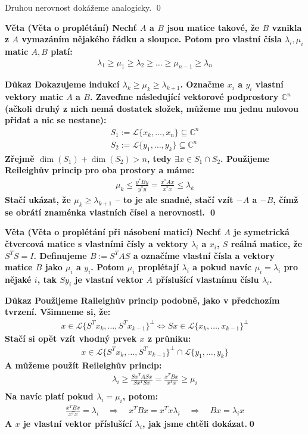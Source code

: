 \documentclass[a4paper,12pt,titlepage]{article}
\newcommand{\dk}{\smallskip\noindent\bf Důkaz\rm{} }
\newcommand{\vt}{\smallskip\noindent\bf Věta\rm{} }
\renewcommand{\L}{\mathcal{L}}
\newcommand{\C}{\mathbb{C}}
\renewcommand{\L}{\mathcal{L}}
\begin{document}
Druhou nerovnost dokážeme analogicky. \qed


\vt (Věta o proplétání) Nechť $A$ a $B$ jsou matice takové, že $B$ vznikla z $A$ 
vymazáním nějakého řádku a sloupce. Potom pro vlastní čísla $\lambda_i,\mu_i$ 
matic $A,B$ platí:
\begin{align}
	\lambda_1 \geq \mu_1 \geq \lambda_2 \geq \dots\geq \mu_{n-1} \geq \lambda_n
\end{align}

\dk Dokazujeme indukcí $\lambda_k \geq \mu_k \geq \lambda_{k+1}$. Označme $x_i$ 
a $y_i$ vlastní vektory matic $A$ a $B$.  Zaveďme následující vektorové 
podprostory $\C^n$ (ačkoli druhý z nich nemá dostatek složek, můžeme mu jednu 
nulovou přidat a nic se nestane):
\begin{align}
S_1 := \L\{x_k, \dots, x_n\} \subseteq \C^n \\
S_2 := \L\{y_1, \dots, y_k\} \subseteq \C^n
\end{align}
Zřejmě $\dim(S_1) + \dim(S_2) > n$, tedy $\exists x \in S_1\cap S_2$. Použijeme 
Reileighův princip pro oba prostory a máme:
\begin{align}
	\mu_k \leq \frac{y^*By}{y^*y} = \frac{x^*Ax}{x^*x} \leq \lambda_k
\end{align}
Stačí ukázat, že $\mu_k \geq \lambda_{k+1}$ -- to je ale snadné, stačí vzít $-A$ 
a $-B$, čímž se obrátí znaménka vlastních čísel a nerovnosti. \qed

\vt (Věta o proplétání při násobení maticí) Nechť $A$ je symetrická čtvercová matice 
s vlastními čísly a vektory $\lambda_i$ a $x_i$, $S$ reálná matice, že $S^TS=I$.  
Definujeme $B := S^TAS$ a označíme vlastní čísla a vektory matice $B$ jako 
$\mu_i$ a $y_i$. Potom $\mu_i$ proplétají $\lambda_i$ a pokud navíc $\mu_i = 
\lambda_i$ pro nějaké $i$, tak $Sy_i$ je vlastní vektor $A$ příslušící vlastnímu 
číslu $\lambda_i$.

\dk Použijeme Raileighův princip podobně, jako v předchozím tvrzení. Všimneme 
si, že:
\begin{align}
	x \in \L\{ S^Tx_k, \dots, S^Tx_{k-1}\}^\perp \Leftrightarrow
	Sx \in \L\{ x_k, \dots, x_{k-1}\}^\perp
\end{align}
Stačí si opět vzít vhodný prvek $x$ z průniku:
\begin{align}
	x \in \L\{ S^Tx_k, \dots, S^Tx_{k-1}\}^\perp \cap \L\{y_1, \dots, y_k\}
\end{align}
A můžeme použít Reileighův princip:
\begin{align}
	\lambda_i \geq \frac{Sx^TASx}{Sx^TSx} = \frac{x^TBx}{x^Tx} \geq \mu_i \\
\end{align}
Na navíc platí pokud $\lambda_i = \mu_i$, potom:
\begin{align}
	\frac{x^TBx}{x^Tx} = \lambda_i \quad\Rightarrow\quad x^TBx=x^Tx\lambda_i 
	\quad\Rightarrow\quad Bx = \lambda_i x
\end{align}
A $x$ je vlastní vektor příslušící $\lambda_i$, jak jsme chtěli dokázat.\qed
\end{document}

